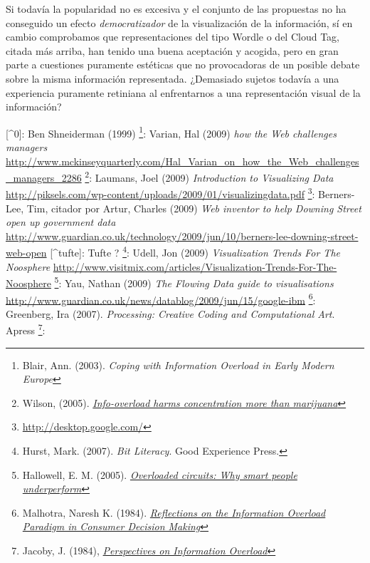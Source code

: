 \documentclass[12pt, a4paper,twoside]{book}
\begin{document}
Si todavía la popularidad no es excesiva y el conjunto de las
propuestas no ha conseguido un efecto \emph{democratizador} de la
visualización de la información, sí en cambio comprobamos que
representaciones del tipo Wordle o del Cloud Tag, citada más
arriba, han tenido una buena aceptación y acogida, pero en gran
parte a cuestiones puramente estéticas que no provocadoras de un
posible debate sobre la misma información representada. ¿Demasiado
sujetos todavía a una experiencia puramente retiniana al
enfrentarnos a una representación visual de la información?

[\^{}0]: Ben Shneiderman (1999)%
\footnote{Blair, Ann. (2003).
\emph{Coping with Information Overload in Early Modern Europe}}:
Varian, Hal (2009) \emph{how the Web challenges managers}
\href{http://www.mckinseyquarterly.com/Hal_Varian_on_how_the_Web_challenges_managers_2286}{http://www.mckinseyquarterly.com/Hal\_Varian\_on\_how\_the\_Web\_challenges\_managers\_2286}%
\footnote{Wilson, (2005).
\emph{\href{http://www.newscientist.com/article/mg18624973.400}{Info-overload harms concentration more than marijuana}}}:
Laumans, Joel (2009) \emph{Introduction to Visualizing Data}
\href{http://piksels.com/wp-content/uploads/2009/01/visualizingdata.pdf}{http://piksels.com/wp-content/uploads/2009/01/visualizingdata.pdf}%
\footnote{\href{http://desktop.google.com/}{http://desktop.google.com/}}:
Berners-Lee, Tim, citador por Artur, Charles (2009)
\emph{Web inventor to help Downing Street open up government data}
\href{http://www.guardian.co.uk/technology/2009/jun/10/berners-lee-downing-street-web-open}{http://www.guardian.co.uk/technology/2009/jun/10/berners-lee-downing-street-web-open}
[\^{}tufte]: Tufte ?%
\footnote{Hurst, Mark. (2007). \emph{Bit Literacy}. Good Experience Press.}:
Udell, Jon (2009) \emph{Visualization Trends For The Noosphere}
\href{http://www.visitmix.com/articles/Visualization-Trends-For-The-Noosphere}{http://www.visitmix.com/articles/Visualization-Trends-For-The-Noosphere}%
\footnote{Hallowell, E. M. (2005).
\emph{\href{http://tr.im/wSsS}{Overloaded circuits: Why smart people underperform}}}:
Yau, Nathan (2009) \emph{The Flowing Data guide to visualisations}
\href{http://www.guardian.co.uk/news/datablog/2009/jun/15/google-ibm}{http://www.guardian.co.uk/news/datablog/2009/jun/15/google-ibm}%
\footnote{Malhotra, Naresh K. (1984).
\emph{\href{http://www.jstor.org/pss/2488913}{Reflections on the Information Overload Paradigm in Consumer Decision Making}}}:
Greenberg, Ira (2007).
\emph{Processing: Creative Coding and Computational Art}. Apress%
\footnote{Jacoby, J. (1984),
\emph{\href{http://www.jstor.org/pss/2488912}{Perspectives on Information Overload}}}:
\end{document}
